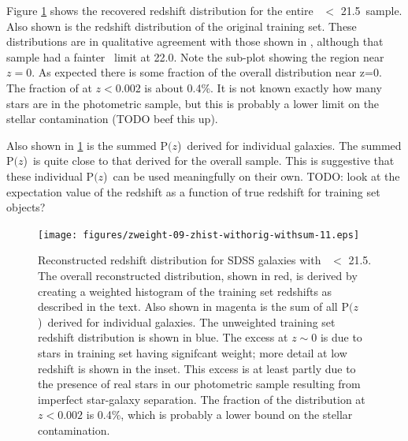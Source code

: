 \documentclass[preprint]{aastex}
\newcommand{\rmax}{21.5}
\newcommand{\pofz}{P$(z$)}
\begin{document}
Figure \ref{fig:pofz} shows the recovered redshift distribution for the entire
\rmag\ $<$ \rmax\ sample.  Also shown is the redshift distribution of the
original training set.  These distributions are in qualitative agreement with
those shown in \citet{CunhaPhotoz09}, although that sample had a fainter \rmag\
limit at 22.0.  Note the sub-plot showing the region near $z=0$.  As expected
there is some fraction of the overall distribution near z=0.  The fraction of
at $z < 0.002$ is about 0.4\%.  It is not known exactly how many stars are in
the photometric sample, but this is probably a lower limit on the stellar
contamination (TODO beef this up).

Also shown in \ref{fig:pofz} is the summed \pofz\ derived for individual
galaxies.  The summed \pofz\ is quite close to that derived for the overall
sample.  This is suggestive that these individual \pofz\ can be used
meaningfully on their own.  TODO: look at the expectation value of the redshift
as a function of true redshift for training set objects?

\begin{figure}[t] \centering
    \texttt{[image: figures/zweight-09-zhist-withorig-withsum-11.eps]}

    \caption{Reconstructed redshift distribution for SDSS galaxies with \rmag\
    $ < $ \rmax.  The overall reconstructed distribution, shown in red, is
    derived by creating a weighted histogram of the training set redshifts as
    described in the text.  Also shown in magenta is the sum of all \pofz\
    derived for individual galaxies.  The unweighted training set redshift
    distribution is shown in blue.  The excess at $z \sim 0$ is due to stars in
    training set having signifcant weight; more detail at low redshift is shown
    in the inset.  This excess is at least partly due to the presence of real
    stars in our photometric sample resulting from imperfect star-galaxy
    separation.  The fraction of the distribution at $z < 0.002$ is 0.4\%,
    which is probably a lower bound on the stellar contamination.
    \label{fig:pofz}}

    \vspace{2em}
\end{figure}
\end{document}
